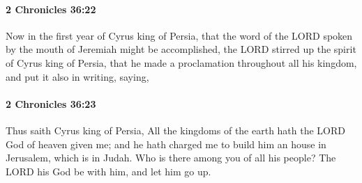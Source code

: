 		\paragraph{2 Chronicles 36:22} %
			\label{2CHRONICLES-36-22}

			Now in the first year of Cyrus king of Persia, that the word of the LORD spoken by the mouth of Jeremiah might be accomplished, the LORD stirred up the spirit of Cyrus king of Persia, that he made a proclamation throughout all his kingdom, and put it also in writing, saying,


		\paragraph{2 Chronicles 36:23} %
			\label{2CHRONICLES-36-23}

			Thus saith Cyrus king of Persia, All the kingdoms of the earth hath the LORD God of heaven given me; and he hath charged me to build him an house in Jerusalem, which is in Judah. Who is there among you of all his people? The LORD his God be with him, and let him go up.

